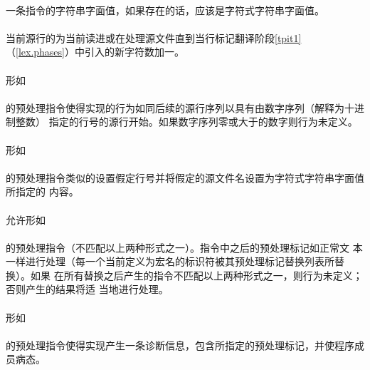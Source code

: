 \paragraph{}
一条指令的字符串字面值，如果存在的话，应该是字符式字符串字面值。

\paragraph{}
当前源行的为当前读进或在处理源文件直到当行标记翻译阶段\ref{tpit1}
（\ref{lex.phases}）中引入的新字符数加一。

\paragraph{}
形如                                                                          \\
\mbox{}                      \\
的预处理指令使得实现的行为如同后续的源行序列以具有由数字序列（解释为十进制整数）
指定的行号的源行开始。如果数字序列零或大于的数字则行为未定义。

\paragraph{}
形如                                                                          \\
\mbox{}                       \\
的预处理指令类似的设置假定行号并将假定的源文件名设置为字符式字符串字面值所指定的
内容。

\paragraph{}
允许形如                                                                      \\
\mbox{}                           \\
的预处理指令（不匹配以上两种形式之一）。指令中之后的预处理标记如正常文
本一样进行处理（每一个当前定义为宏名的标识符被其预处理标记替换列表所替换）。如果
在所有替换之后产生的指令不匹配以上两种形式之一，则行为未定义；否则产生的结果将适
当地进行处理。

\paragraph{}
形如                                                                          \\
\mbox{}                \\
的预处理指令使得实现产生一条诊断信息，包含所指定的预处理标记，并使程序成员病态。

